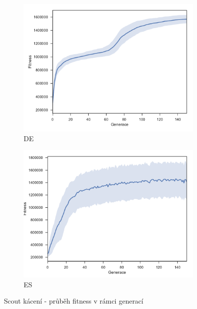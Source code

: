 	\begin{figure}[p]
		\centering
		\begin{subfigure}{.5\textwidth}
			\centering
			\includegraphics[width=\linewidth]{../img/WoodMap/DE/WCuttorCutMem}
			\caption{DE}
			\label{obr04:CutDE}
		\end{subfigure}%
		\begin{subfigure}{.5\textwidth}
			\centering
			\includegraphics[width=\linewidth]{../img/WoodMap/ES/WoodCutES}
			\caption{ES}
			\label{obr04:CutES}
		\end{subfigure}
		\caption{Scout kácení - průběh fitness v rámci generací}
		\label{obr04:Cut}
	\end{figure}
	\clearpage
	
